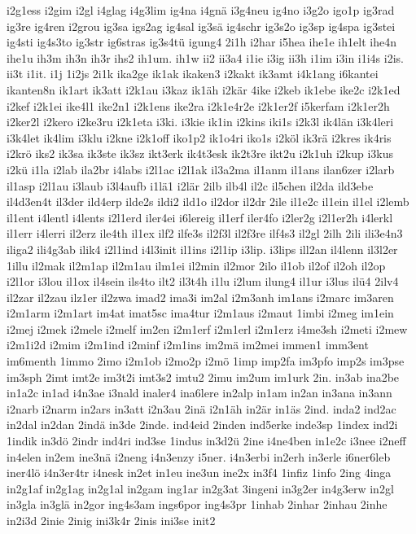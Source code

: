 {i2g1ess
i2gim
i2gl
i4glag
i4g3lim
ig4na
i4gnä
i3g4neu
ig4no
i3g2o
igo1p
ig3rad
ig3re
ig4ren
i2grou
ig3sa
igs2ag
ig4sal
ig3sä
ig4schr
ig3s2o
ig3sp
ig4spa
ig3stei
ig4sti
ig4s3to
ig3str
ig6stras
ig3s4tü
igung4
2i1h
i2har
i5hea
ihe1e
ih1elt
ihe4n
ihe1u
ih3m
ih3n
ih3r
ihs2
ih1um.
ih1w
ii2
ii3a4
i1ie
i3ig
ii3h
i1im
i3in
i1i4s
i2is.
ii3t
i1it.
i1j
1i2js
2i1k
ika2ge
ik1ak
ikaken3
i2kakt
ik3amt
i4k1ang
i6kantei
ikanten8n
ik1art
ik3att
i2k1au
i3kaz
ik1äh
i2kär
4ike
i2keb
ik1ebe
ike2c
i2k1ed
i2kef
i2k1ei
ike4l1
ike2n1
i2k1ens
ike2ra
i2k1e4r2e
i2k1er2f
i5kerfam
i2k1er2h
i2ker2l
i2kero
i2ke3ru
i2k1eta
i3ki.
i3kie
ik1in
i2kins
iki1s
i2k3l
ik4län
i3k4leri
i3k4let
ik4lim
i3klu
i2kne
i2k1off
iko1p2
ik1o4ri
iko1s
i2köl
ik3rä
i2kres
ik4ris
i2krö
iks2
ik3sa
ik3ste
ik3sz
ikt3erk
ik4t3esk
ik2t3re
ikt2u
i2k1uh
i2kup
i3kus
i2kü
i1la
i2lab
ila2br
i4labs
i2l1ac
i2l1ak
il3a2ma
il1anm
il1ans
ilan6zer
i2larb
il1asp
i2l1au
i3laub
i3l4aufb
i1lä1
i2lär
2ilb
ilb4l
il2c
il5chen
il2da
ild3ebe
il4d3en4t
il3der
ild4erp
ilde2s
ildi2
ild1o
il2dor
il2dr
2ile
il1e2c
il1ein
il1el
i2lemb
il1ent
i4lentl
i4lents
i2l1erd
iler4ei
i6lereig
il1erf
iler4fo
i2ler2g
i2l1er2h
i4lerkl
il1err
i4lerri
il2erz
ile4th
il1ex
ilf2
ilfe3s
il2f3l
il2f3re
ilf4s3
il2gl
2ilh
2ili
ili3e4n3
iliga2
ili4g3ab
ilik4
i2l1ind
i4l3init
il1ins
i2l1ip
i3lip.
i3lips
ill2an
il4lenn
il3l2er
1illu
il2mak
il2m1ap
il2m1au
ilm1ei
il2min
il2mor
2ilo
il1ob
il2of
il2oh
il2op
i2l1or
i3lou
il1ox
il4sein
ils4to
ilt2
il3t4h
i1lu
i2lum
ilung4
il1ur
i3lus
ilü4
2ilv4
il2zar
il2zau
ilz1er
il2zwa
imad2
ima3i
im2al
i2m3anh
im1ans
i2marc
im3aren
i2m1arm
i2m1art
im4at
imat5sc
ima4tur
i2m1aus
i2maut
1imbi
i2meg
im1ein
i2mej
i2mek
i2mele
i2melf
im2en
i2m1erf
i2m1erl
i2m1erz
i4me3sh
i2meti
i2mew
i2m1i2d
i2mim
i2m1ind
i2minf
i2m1ins
im2mä
im2mei
immen1
imm3ent
im6menth
1immo
2imo
i2m1ob
i2mo2p
i2mö
1imp
imp2fa
im3pfo
imp2s
im3pse
im3sph
2imt
imt2e
im3t2i
imt3s2
imtu2
2imu
im2um
im1urk
2in.
in3ab
ina2be
in1a2c
in1ad
i4n3ae
i3nald
inaler4
ina6lere
in2alp
in1am
in2an
in3ana
in3ann
i2narb
i2narm
in2ars
in3att
i2n3au
2inä
i2n1äh
in2är
in1äs
2ind.
inda2
ind2ac
in2dal
in2dan
2indä
in3de
2inde.
ind4eid
2inden
ind5erke
inde3sp
1index
ind2i
1indik
in3dö
2indr
ind4ri
ind3se
1indus
in3d2ü
2ine
i4ne4ben
in1e2c
i3nee
i2neff
in4elen
in2em
ine3nä
i2neng
i4n3enzy
i5ner.
i4n3erbi
in2erh
in3erle
i6ner6leb
iner4lö
i4n3er4tr
i4nesk
in2et
in1eu
ine3un
ine2x
in3f4
1infiz
1info
2ing
4inga
in2g1af
in2g1ag
in2g1al
in2gam
ing1ar
in2g3at
3ingeni
in3g2er
in4g3erw
in2gl
in3gla
in3glä
in2gor
ing4s3am
ings6por
ing4s3pr
1inhab
2inhar
2inhau
2inhe
in2i3d
2inie
2inig
ini3k4r
2inis
ini3se
init2
}
